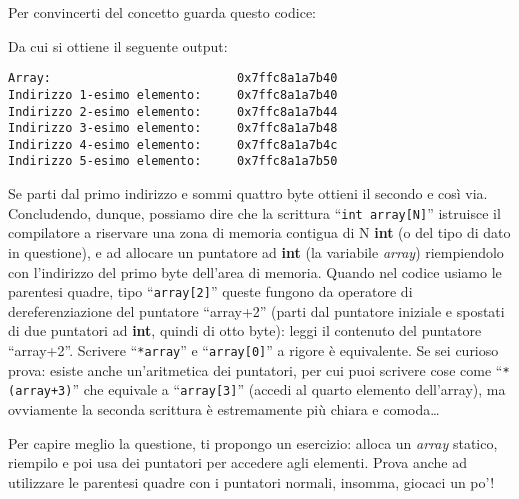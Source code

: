 Per convincerti del concetto guarda questo codice:

Da cui si ottiene il seguente output:
\begin{shaded}
\begin{verbatim}
Array:                          0x7ffc8a1a7b40                                                                                                                          
Indirizzo 1-esimo elemento:     0x7ffc8a1a7b40                                                                                                                          
Indirizzo 2-esimo elemento:     0x7ffc8a1a7b44                                                                                                                          
Indirizzo 3-esimo elemento:     0x7ffc8a1a7b48                                                                                                                          
Indirizzo 4-esimo elemento:     0x7ffc8a1a7b4c                                                                                                                          
Indirizzo 5-esimo elemento:     0x7ffc8a1a7b50      
\end{verbatim}
\end{shaded}
Se parti dal primo indirizzo e sommi quattro byte ottieni il secondo e così via. \\

Concludendo, dunque, possiamo dire che la scrittura ``\lstinline|int array[N]|'' istruisce il compilatore a riservare una zona di memoria contigua di N \textbf{int} (o del tipo di dato in questione), e ad allocare un puntatore ad \textbf{int} (la variabile \emph{array}) riempiendolo con l'indirizzo del primo byte dell'area di memoria. Quando nel codice usiamo le parentesi quadre, tipo ``\lstinline|array[2]|'' queste fungono da operatore di dereferenziazione del puntatore ``array+2'' (parti dal puntatore iniziale e spostati di due puntatori ad \textbf{int}, quindi di otto byte): leggi il contenuto del puntatore ``array+2''. Scrivere ``\lstinline|*array|'' e ``\lstinline|array[0]|'' a rigore è equivalente. Se sei curioso prova: esiste anche un'aritmetica dei puntatori, per cui puoi scrivere cose come ``\lstinline|*(array+3)|'' che equivale a ``\lstinline|array[3]|'' (accedi al quarto elemento dell'array), ma ovviamente la seconda scrittura è estremamente più chiara e comoda\ldots


Per capire meglio la questione, ti propongo un esercizio: alloca un \emph{array} statico, riempilo e poi usa dei puntatori per accedere agli elementi. Prova anche ad utilizzare le parentesi quadre con i puntatori normali, insomma, giocaci un po'!

